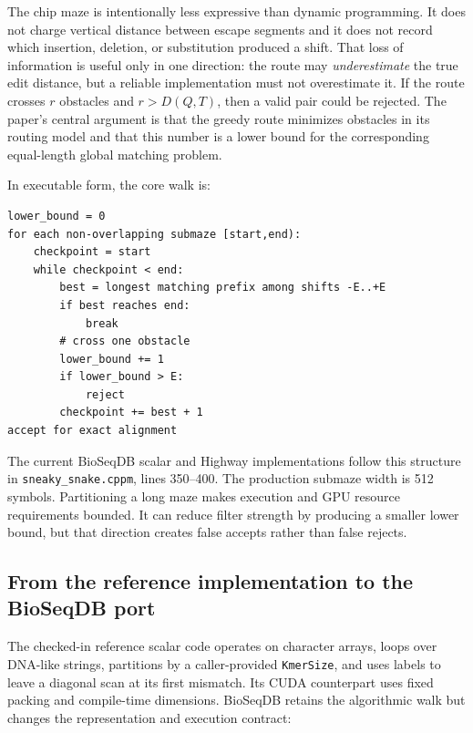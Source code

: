 The chip maze is intentionally less expressive than dynamic programming.  It
does not charge vertical distance between escape segments and it does not
record which insertion, deletion, or substitution produced a shift.  That
loss of information is useful only in one direction: the route may
\emph{underestimate} the true edit distance, but a reliable implementation
must not overestimate it.  If the route crosses \(r\) obstacles and
\(r>D(Q,T)\), then a valid pair could be rejected.  The paper's central
argument is that the greedy route minimizes obstacles in its routing model and
that this number is a lower bound for the corresponding equal-length global
matching problem.

In executable form, the core walk is:

\begin{verbatim}
lower_bound = 0
for each non-overlapping submaze [start,end):
    checkpoint = start
    while checkpoint < end:
        best = longest matching prefix among shifts -E..+E
        if best reaches end:
            break
        # cross one obstacle
        lower_bound += 1
        if lower_bound > E:
            reject
        checkpoint += best + 1
accept for exact alignment
\end{verbatim}

The current BioSeqDB scalar and Highway implementations follow this structure
in \texttt{sneaky\_snake.cppm}, lines 350--400.  The production submaze width
is 512 symbols.  Partitioning a long maze makes execution and GPU resource
requirements bounded.  It can reduce filter strength by producing a smaller
lower bound, but that direction creates false accepts rather than false
rejects.

\subsection{From the reference implementation to the BioSeqDB port}

The checked-in reference scalar code operates on character arrays, loops over
DNA-like strings, partitions by a caller-provided \texttt{KmerSize}, and uses
labels to leave a diagonal scan at its first mismatch.  Its CUDA counterpart
uses fixed packing and compile-time dimensions.  BioSeqDB retains the
algorithmic walk but changes the representation and execution contract:

